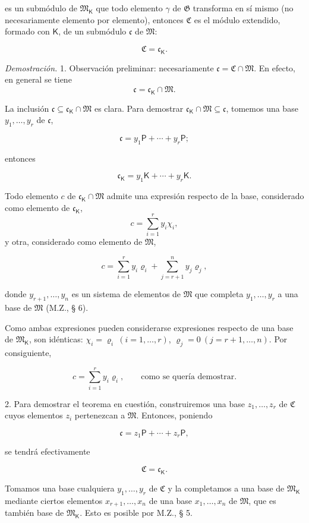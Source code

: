 es un submódulo de \(\mathfrak M_{\mathsf K}\) que todo elemento \(\gamma\) de \(\mathfrak G\) transforma en sí mismo (no necesariamente elemento por elemento), entonces \(\mathfrak C\) es el módulo extendido, formado con \(\mathsf K\), de un submódulo \(\mathfrak c\) de \(\mathfrak M\):

\[
\mathfrak C=\mathfrak c_{\mathsf K}.
\]

\emph{Demostración.} 1. Observación preliminar: necesariamente \(\mathfrak c=\mathfrak C\cap\mathfrak M\). En efecto, en general se tiene
\[
\mathfrak c=\mathfrak c_{\mathsf K}\cap\mathfrak M.
\]

La inclusión \(\mathfrak c\subseteq\mathfrak c_{\mathsf K}\cap\mathfrak M\) es clara. Para demostrar \(\mathfrak c_{\mathsf K}\cap\mathfrak M\subseteq\mathfrak c\), tomemos una base \(y_1,\ldots,y_r\) de \(\mathfrak c\),

\[
\mathfrak c=y_1\mathsf P+\cdots+y_r\mathsf P;
\]

entonces

\[
\mathfrak c_{\mathsf K}=y_1\mathsf K+\cdots+y_r\mathsf K.
\]

Todo elemento \(c\) de \(\mathfrak c_{\mathsf K}\cap\mathfrak M\) admite una expresión respecto de la base, considerado como elemento de \(\mathfrak c_{\mathsf K}\),
\[
c=\sum_{i=1}^{r}y_i\chi_i,
\]
y otra, considerado como elemento de \(\mathfrak M\),

\[
c=\sum_{i=1}^{r}y_i\varrho_i+\sum_{j=r+1}^{n}y_j\varrho_j,
\]

donde \(y_{r+1},\ldots,y_n\) es un sistema de elementos de \(\mathfrak M\) que completa \(y_1,\ldots,y_r\) a una base de \(\mathfrak M\) (M.Z., § 6).

Como ambas expresiones pueden considerarse expresiones respecto de una base de \(\mathfrak M_{\mathsf K}\), son idénticas: \(\chi_i=\varrho_i\ (i=1,\ldots,r)\), \(\varrho_j=0\ (j=r+1,\ldots,n)\). Por consiguiente,

\[
c=\sum_{i=1}^{r}y_i\varrho_i,
\qquad\text{como se quería demostrar.}
\]

2. Para demostrar el teorema en cuestión, construiremos una base \(z_1,\ldots,z_r\) de \(\mathfrak C\) cuyos elementos \(z_i\) pertenezcan a \(\mathfrak M\). Entonces, poniendo

\[
\mathfrak c=z_1\mathsf P+\cdots+z_r\mathsf P,
\]

se tendrá efectivamente

\[
\mathfrak C=\mathfrak c_{\mathsf K}.
\]

Tomamos una base cualquiera \(y_1,\ldots,y_r\) de \(\mathfrak C\) y la completamos a una base de \(\mathfrak M_{\mathsf K}\) mediante ciertos elementos \(x_{r+1},\ldots,x_n\) de una base \(x_1,\ldots,x_n\) de \(\mathfrak M\), que es también base de \(\mathfrak M_{\mathsf K}\). Esto es posible por M.Z., § 5.

